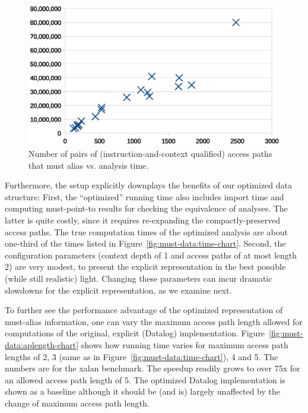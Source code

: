 \begin{figure}[htp]
\centering
\includegraphics[clip,width=\linewidth]{assets/must-data/pairs.eps}
\caption{Number of pairs of (instruction-and-context qualified) access paths that must alias vs. analysis time.}
\label{fig:must-data:pairs-chart}
\end{figure}

Furthermore, the setup explicitly downplays the benefits of our optimized data structure: First, the ``optimized'' running time also includes import time and computing must-point-to results for checking the equivalence of analyses. The latter is quite costly, since it requires re-expanding the compactly-preserved access paths. The true computation times of the optimized analysis are about one-third of the times listed in Figure~\ref{fig:must-data:time-chart}. Second, the configuration parameters (context depth of 1 and access paths of at most length 2) are very modest, to present the explicit representation in the best possible (while still realistic) light. Changing these parameters can incur dramatic slowdowns for the explicit representation, as we examine next.


To further see the performance advantage of the optimized representation of must-alias information, one can vary the maximum access path length allowed for computations of the original, explicit (Datalog) implementation. Figure~\ref{fig:must-data:aplength-chart} shows how running time varies for maximum access path lengths of 2, 3 (same as in Figure~\ref{fig:must-data:time-chart}), 4 and 5. The numbers are for the xalan benchmark. The speedup readily grows to over 75x for an allowed access path length of 5. The optimized Datalog implementation is shown as a baseline although it should be (and is) largely unaffected by the change of maximum access path length.

